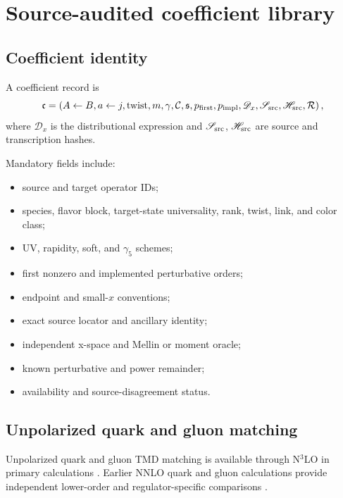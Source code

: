 \documentclass[11pt]{article}
\newcommand{\cR}{\mathcal R}
\begin{document}
\section{Source-audited coefficient library}
\label{sec:coefficients}

\subsection{Coefficient identity}

A coefficient record is
\begin{equation}
 \mathfrak c=
 \left(
 A\leftarrow B,
 a\leftarrow j,
 \text{twist},m,
 \gamma,\mathcal C,
 \mathfrak s,
 p_{\rm first},p_{\rm impl},
 \mathscr D_x,
 \mathscr S_{\rm src},
 \mathscr H_{\rm src},
 \cR
 \right),
 \label{eq:coefficient-record}
\end{equation}
where \(\mathscr D_x\) is the distributional expression and \(\mathscr S_{\rm src}\), \(\mathscr H_{\rm src}\) are source and transcription hashes.

Mandatory fields include:
\begin{itemize}
\item source and target operator IDs;
\item species, flavor block, target-state universality, rank, twist, link, and color class;
\item UV, rapidity, soft, and \(\gamma_5\) schemes;
\item first nonzero and implemented perturbative orders;
\item endpoint and small-\(x\) conventions;
\item exact source locator and ancillary identity;
\item independent x-space and Mellin or moment oracle;
\item known perturbative and power remainder;
\item availability and source-disagreement status.
\end{itemize}

\subsection{Unpolarized quark and gluon matching}

Unpolarized quark and gluon TMD matching is available through N\(^3\)LO in primary calculations \cite{EbertMistlbergerVita2020,LuoEtAl2021}.  Earlier NNLO quark and gluon calculations provide independent lower-order and regulator-specific comparisons \cite{LuoQuark2019,LuoGluon2020}.
\end{document}
